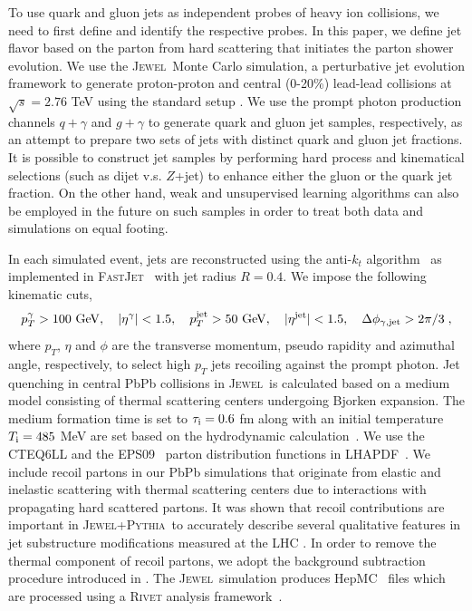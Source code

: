 \documentclass[notoc]{JHEP3}
\newcommand{\text}[1]{{\rm #1}}
\newcommand{\jw}{\textsc{Jewel}~}
\newcommand{\jwpy}{\textsc{Jewel+Pythia}~}
\begin{document}
To use quark and gluon jets as independent probes of heavy ion collisions, we need to first define and identify the respective probes. In this paper, we define jet flavor based on the parton from hard scattering that initiates the parton shower evolution. We use the \jw Monte Carlo simulation, a perturbative jet evolution framework to generate proton-proton and central (0-20\%) lead-lead collisions at $\sqrt{s}=2.76$ TeV using the standard setup \cite{Zapp:2013zya}. We use the prompt photon production channels \cite{KunnawalkamElayavalli:2016ttl} $q +\gamma$ and $g +\gamma$ to generate quark and gluon jet samples, respectively, as an attempt to prepare two sets of jets with distinct quark and gluon jet fractions. It is possible to construct jet samples by performing hard process and kinematical selections (such as dijet v.s. $Z$+jet) to enhance either the gluon or the quark jet fraction. On the other hand, weak and unsupervised learning algorithms \cite{Metodiev:2017vrx,Komiske:2018oaa,Metodiev:2018ftz} can also be employed in the future on such samples in order to treat both data and simulations on equal footing.

In each simulated event, jets are reconstructed using the anti-$k_t$ algorithm~\cite{Cacciari:2008gp} as implemented in \textsc{FastJet}~\cite{Cacciari:2011ma} with jet radius $R = 0.4$. We impose the following kinematic cuts,
\begin{equation}
    p^{\gamma}_T > 100~{\rm GeV}, ~~~ |\eta^{\rm \gamma}|<1.5, ~~~ p^{\rm jet}_T > 50~{\rm GeV}, ~~~ |\eta^{\rm jet}|<1.5, ~~~\Delta \phi_{\gamma, {\rm jet}} > 2\pi/3\;,
\end{equation}
where $p_T$, $\eta$ and $\phi$ are the transverse momentum, pseudo rapidity and azimuthal angle, respectively, to select high $p_T$ jets recoiling against the prompt photon. Jet quenching in central PbPb collisions in \jw is calculated based on a medium model consisting of thermal scattering centers undergoing Bjorken expansion. The medium formation time is set to $\tau_\text{i}=0.6 $ fm along with an initial temperature $T_\text{i}=485$ MeV are set based on the hydrodynamic calculation~\cite{Shen:2012vn,Shen:2014vra}. We use the \textsc{CTEQ6LL} \cite{Pumplin:2002vw} and the \textsc{EPS09}~\cite{Eskola:2009uj} parton distribution functions in \textsc{LHAPDF}~\cite{Whalley:2005nh}. We include recoil partons in our PbPb simulations that originate from elastic and inelastic scattering with thermal scattering centers due to interactions with propagating hard scattered partons. It was shown that recoil contributions are important in \jwpy to accurately describe several qualitative features in jet substructure modifications measured at the LHC \cite{KunnawalkamElayavalli:2017hxo,Milhano:2017nzm}. In order to remove the thermal component of recoil partons, we adopt the background subtraction procedure introduced in \cite{KunnawalkamElayavalli:2017hxo,Milhano:2017nzm}. The \jw simulation produces HepMC~\cite{Dobbs:2001ck} files which are processed using a \textsc{Rivet} analysis framework~\cite{Buckley:2010ar}.
\end{document}
